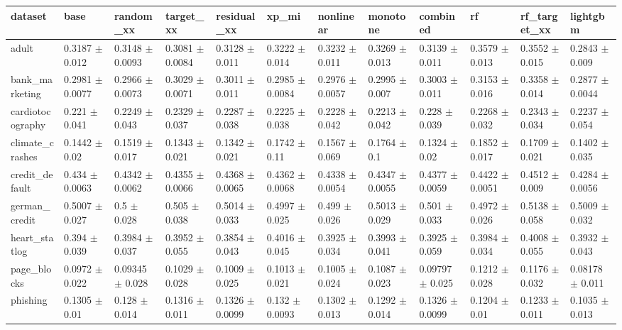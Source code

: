 \begin{tabular}{llllllllllll}
\toprule
dataset & base & random\_xx & target\_xx & residual\_xx & xp\_mi & nonlinear & monotone & combined & rf & rf\_target\_xx & lightgbm \\
\midrule
adult & 0.3187 $\pm$ 0.012 & 0.3148 $\pm$ 0.0093 & 0.3081 $\pm$ 0.0084 & 0.3128 $\pm$ 0.011 & 0.3222 $\pm$ 0.014 & 0.3232 $\pm$ 0.011 & 0.3269 $\pm$ 0.013 & 0.3139 $\pm$ 0.011 & 0.3579 $\pm$ 0.013 & 0.3552 $\pm$ 0.015 & 0.2843 $\pm$ 0.009 \\
bank\_marketing & 0.2981 $\pm$ 0.0077 & 0.2966 $\pm$ 0.0073 & 0.3029 $\pm$ 0.0071 & 0.3011 $\pm$ 0.011 & 0.2985 $\pm$ 0.0084 & 0.2976 $\pm$ 0.0057 & 0.2995 $\pm$ 0.007 & 0.3003 $\pm$ 0.011 & 0.3153 $\pm$ 0.016 & 0.3358 $\pm$ 0.014 & 0.2877 $\pm$ 0.0044 \\
cardiotocography & 0.221 $\pm$ 0.041 & 0.2249 $\pm$ 0.043 & 0.2329 $\pm$ 0.037 & 0.2287 $\pm$ 0.038 & 0.2225 $\pm$ 0.038 & 0.2228 $\pm$ 0.042 & 0.2213 $\pm$ 0.042 & 0.228 $\pm$ 0.039 & 0.2268 $\pm$ 0.032 & 0.2343 $\pm$ 0.034 & 0.2237 $\pm$ 0.054 \\
climate\_crashes & 0.1442 $\pm$ 0.02 & 0.1519 $\pm$ 0.017 & 0.1343 $\pm$ 0.021 & 0.1342 $\pm$ 0.021 & 0.1742 $\pm$ 0.11 & 0.1567 $\pm$ 0.069 & 0.1764 $\pm$ 0.1 & 0.1324 $\pm$ 0.02 & 0.1852 $\pm$ 0.017 & 0.1709 $\pm$ 0.021 & 0.1402 $\pm$ 0.035 \\
credit\_default & 0.434 $\pm$ 0.0063 & 0.4342 $\pm$ 0.0062 & 0.4355 $\pm$ 0.0066 & 0.4368 $\pm$ 0.0065 & 0.4362 $\pm$ 0.0068 & 0.4338 $\pm$ 0.0054 & 0.4347 $\pm$ 0.0055 & 0.4377 $\pm$ 0.0059 & 0.4422 $\pm$ 0.0051 & 0.4512 $\pm$ 0.009 & 0.4284 $\pm$ 0.0056 \\
german\_credit & 0.5007 $\pm$ 0.027 & 0.5 $\pm$ 0.028 & 0.505 $\pm$ 0.038 & 0.5014 $\pm$ 0.033 & 0.4997 $\pm$ 0.025 & 0.499 $\pm$ 0.026 & 0.5013 $\pm$ 0.029 & 0.501 $\pm$ 0.033 & 0.4972 $\pm$ 0.026 & 0.5138 $\pm$ 0.058 & 0.5009 $\pm$ 0.032 \\
heart\_statlog & 0.394 $\pm$ 0.039 & 0.3984 $\pm$ 0.037 & 0.3952 $\pm$ 0.055 & 0.3854 $\pm$ 0.043 & 0.4016 $\pm$ 0.045 & 0.3925 $\pm$ 0.034 & 0.3993 $\pm$ 0.041 & 0.3925 $\pm$ 0.059 & 0.3984 $\pm$ 0.034 & 0.4008 $\pm$ 0.055 & 0.3932 $\pm$ 0.043 \\
page\_blocks & 0.0972 $\pm$ 0.022 & 0.09345 $\pm$ 0.028 & 0.1029 $\pm$ 0.028 & 0.1009 $\pm$ 0.025 & 0.1013 $\pm$ 0.021 & 0.1005 $\pm$ 0.024 & 0.1087 $\pm$ 0.023 & 0.09797 $\pm$ 0.025 & 0.1212 $\pm$ 0.028 & 0.1176 $\pm$ 0.032 & 0.08178 $\pm$ 0.011 \\
phishing & 0.1305 $\pm$ 0.01 & 0.128 $\pm$ 0.014 & 0.1316 $\pm$ 0.011 & 0.1326 $\pm$ 0.0099 & 0.132 $\pm$ 0.0093 & 0.1302 $\pm$ 0.013 & 0.1292 $\pm$ 0.014 & 0.1326 $\pm$ 0.0099 & 0.1204 $\pm$ 0.01 & 0.1233 $\pm$ 0.011 & 0.1035 $\pm$ 0.013 \\

\end{tabular}
